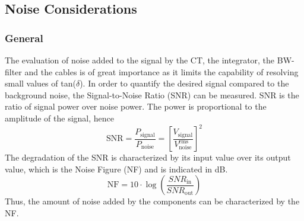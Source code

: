\subsection{Noise Considerations}
\subsubsection{General}
The evaluation of noise added to the signal by the CT, the integrator, the BW-filter and the cables is of great importance as it limits the capability of resolving small values of tan($\delta$).
In order to quantify the desired signal compared to the background noise, the Signal-to-Noise Ratio (SNR)  can be measured. SNR is  the ratio of signal power over noise power. The power is proportional to the amplitude of the signal, hence 
\begin{equation}
	\textrm{SNR}=\frac{P_{\textrm{signal}}}{P_{\textrm{noise}}} = \left[\frac{V_{\textrm{signal}}}{V_{\textrm{noise}}^{\textrm{rms}}}\right]^2
\end{equation}
The degradation of the SNR is characterized by its input value over its output value, which is the Noise Figure (NF) and is indicated in dB.
\begin{equation}
	\textrm{NF} = 10\cdot \log\left(\frac{SNR_{\textrm{in}}}{SNR_{\textrm{out}}}\right)
\end{equation}
Thus, the amount of noise added by the components can be characterized by the NF. 


